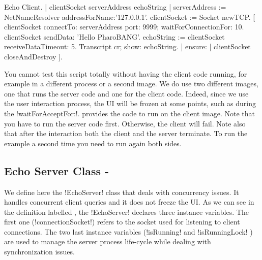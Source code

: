 \documentclass[a4paper,10pt,twoside]{book}
\begin{document}
\begin{script}[echoClient]{Echo Client.}
| clientSocket serverAddress echoString |
serverAddress := NetNameResolver addressForName:'127.0.0.1'.
clientSocket := Socket newTCP.
[ clientSocket 
	connectTo: serverAddress port: 9999;
	waitForConnectionFor: 10.
 clientSocket sendData: 'Hello PharoBANG'.
 echoString  := clientSocket receiveDataTimeout: 5.
 Transcript cr; show: echoString.
] ensure: [ clientSocket closeAndDestroy ].
\end{script}

You cannot test this script totally without having the client code running, for example in a different process or a second image. 
We  do use two different images, one that runs the server code and one for the client code. 
Indeed, since we use the user interaction process, the \pharo UI will be frozen at some points, such as during the \ct!waitForAcceptFor:!.
 provides the code to run on the client image.
Note that you have to run the server code first.
Otherwise, the client will fail.
Note also that after the interaction both the client and the server terminate.
To run the example a second time you need to run again both sides.

%

\subsection{Echo Server Class - }\label{sec:echoServerClass}
We define here the \ct!EchoServer! class that deals with concurrency issues.
It handles concurrent client queries and it does not freeze the UI.
As we can see in the definition labelled , the \ct!EchoServer! declares three instance variables.
The first one (\ct!connectionSocket!) refers to the socket used for listening to client connections.
The two last instance variables (\ct!isRunning!  and \ct!isRunningLock! ) are used to manage the server process life-cycle while dealing with synchronization issues. 
 
\end{document}
